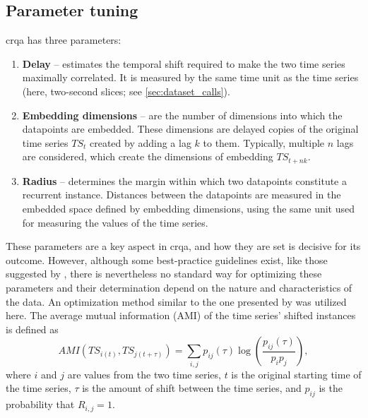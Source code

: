 \subsection{Parameter tuning}
\label{subsec:parameters_crqa}

\Ac{crqa} has three parameters:

\begin{enumerate}
	\item \textbf{Delay} -- estimates the temporal shift required to make the two time series maximally correlated.
	It is measured by the same time unit as the time series (here, two-second slices; see \cref{sec:dataset_calls}).
	
	\item \textbf{Embedding dimensions} -- are the number of dimensions into which the datapoints are embedded.
	These dimensions are delayed copies of the original time series $TS_t$ created by adding a lag $k$ to them.
	Typically, multiple $n$ lags are considered, which create the dimensions of embedding $TS_{t + nk}$.
	
	\item \textbf{Radius} -- determines the margin within which two datapoints constitute a recurrent instance.
	Distances between the datapoints are measured in the embedded space defined by embedding dimensions, using the same unit used for measuring the values of the time series.
\end{enumerate}
%
These parameters are a key aspect in \ac{crqa}, and how they are set is decisive for its outcome.
However, although some best-practice guidelines exist, like those suggested by \citet{Coco2014crqa-r}, there is nevertheless no standard way for optimizing these parameters and their determination depend on the nature and characteristics of the data.
An optimization method similar to the one presented by \citet{Marwan2007recurrence} was utilized here.
The average mutual information (AMI) of the time series' shifted instances is defined as 
\begin{equation}
	\label{eq:average_mutual_information}
	AMI\left( TS_{i(t)}, TS_{j(t + \tau)} \right) = \sum_{i,j} p_{ij} (\tau) \log \left( \frac{p_{ij} \left( \tau \right)}{p_i p_j} \right),
\end{equation}
\noindent
%
where $i$ and $j$ are values from the two time series, $t$ is the original starting time of the time series, $\tau$ is the amount of shift between the time series, and $p_{ij}$ is the probability that $R_{i, j} = 1$.
